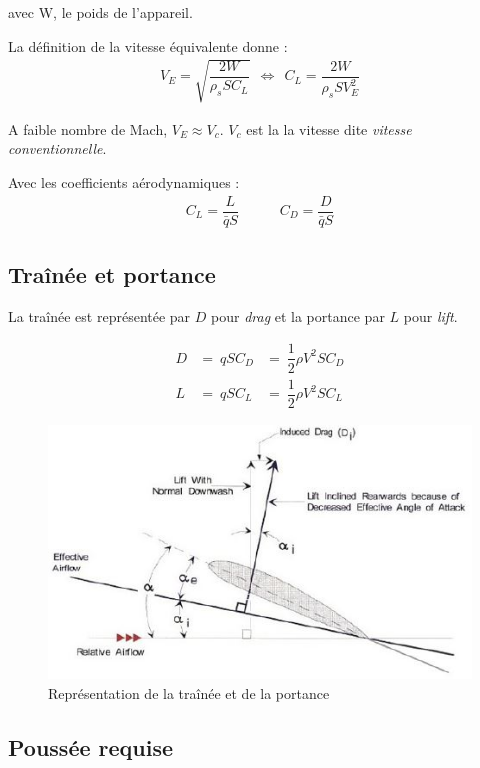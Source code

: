\documentclass{report}
\begin{document}
avec W, le poids de l'appareil.

La définition de la vitesse équivalente donne :
\begin{eqnarray}
V_E=\sqrt{\dfrac{2W}{\rho_s S C_L}} ~~\Leftrightarrow~~ C_L = \dfrac{2W}{\rho_s S V_E^2}
\end{eqnarray}

A faible nombre de Mach, $V_E\approx V_c$. $V_c$ est la la vitesse dite \textit{vitesse conventionnelle}.

Avec les coefficients aérodynamiques :
\begin{eqnarray}
C_L=\dfrac{L}{\bar{q}S} &~~~~~~&C_D=\dfrac{D}{\bar{q}S}
\end{eqnarray}

\subsection{Traînée et portance}

La traînée est représentée par $D$ pour \textit{drag} et la portance par $L$ pour \textit{lift}.

\begin{eqnarray}
D&= ~qSC_D&=~\dfrac{1}{2}\rho V^2 S C_D\\
L&= ~qSC_L &=~\dfrac{1}{2}\rho V^2 S C_L
\end{eqnarray}

\begin{figure}[h!]
    \centering
    \includegraphics{4.JPG}
    \caption{Représentation de la traînée et de la portance}
    \label{4}
\end{figure}

\subsection{Poussée requise}
\end{document}
